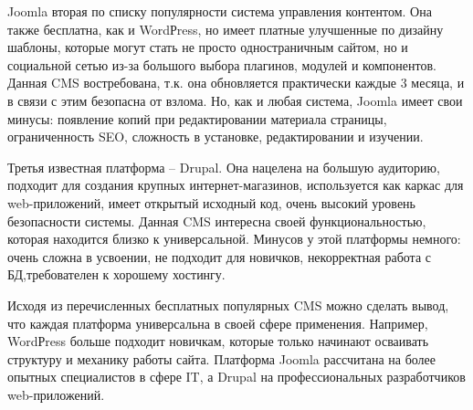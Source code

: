 Joomla вторая по списку популярности система управления контентом.
Она также бесплатна, как и WordРress, но имеет платные улучшенные по дизайну шаблоны, которые могут стать не просто одностраничным сайтом, но и социальной сетью из-за большого выбора плагинов, модулей и компонентов.
Данная CMS востребована, т.к. она обновляется практически каждые 3 месяца, и в связи с этим безопасна от взлома.
Но, как и любая система, Joomla имеет свои минусы: появление копий при редактировании материала страницы, ограниченность SEO, сложность в установке, редактировании и изучении.

Третья известная платформа – Drupal.
Она нацелена на большую аудиторию, подходит для создания крупных интернет-магазинов, используется как каркас для web-приложений, имеет открытый исходный код, очень высокий уровень безопасности системы.
Данная CMS интересна своей функциональностью, которая находится близко к универсальной.
Минусов у этой платформы немного: очень сложна в усвоении, не подходит для новичков, некорректная работа с БД,требователен к хорошему хостингу.

Исходя из перечисленных бесплатных популярных CMS можно сделать вывод, что каждая платформа универсальна в своей сфере применения.
Например, WordРress больше подходит новичкам, которые только начинают осваивать структуру и механику работы сайта.
Платформа Joomla рассчитана на более опытных специалистов в сфере IT, а Drupal на профессиональных разработчиков web-приложений. 

